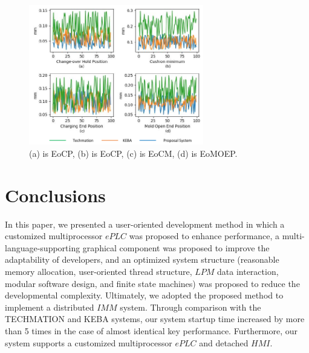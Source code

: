 \documentclass[journal,UTF8]{IEEEtran}
\begin{document}
	\begin{figure}
		\centering
		\includegraphics[width=3in]{fig/Compare.pdf}
		\caption{(a) is EoCP, (b) is EoCP, (c) is EoCM, (d) is EoMOEP.}
		\label{fig:Compare}
	\end{figure}
	\section{Conclusions}
	\label{conclusion}
	In this paper, we presented a user-oriented development method in which a customized multiprocessor $ePLC$ was proposed to enhance performance, a multi-language-supporting graphical component was proposed to improve the adaptability of developers, and an optimized system structure (reasonable memory allocation, user-oriented thread structure, $LPM$ data interaction, modular software design, and finite state machines) was proposed to reduce the developmental complexity. Ultimately, we adopted the proposed method to implement a distributed $IMM$ system. Through comparison with the TECHMATION and KEBA systems, our system startup time increased by more than 5 times in the case of almost identical key performance. Furthermore, our system supports a customized multiprocessor $ePLC$ and detached $HMI$.
	
	
	
	
	
	\ifCLASSOPTIONcaptionsoff
	\newpage
	\fi
	
	
	
	
	
	
\end{document}
